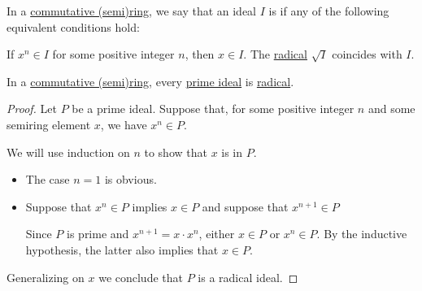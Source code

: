 \begin{definition}\label{def:radical_ideal}\mimprovised
  In a \hyperref[def:ring/commutative]{commutative (semi)ring}, we say that an ideal \( I \) is  if any of the following equivalent conditions hold:
  \begin{thmenum}
     If \( x^n \in I \) for some positive integer \( n \), then \( x \in I \).
     The \hyperref[def:radical_of_ideal]{radical} \( \sqrt I \) coincides with \( I \).
  \end{thmenum}
\end{definition}

\begin{proposition}\label{thm:prime_ideal_is_radical}
  In a \hyperref[def:ring/commutative]{commutative (semi)ring}, every \hyperref[def:semiring_ideal/prime]{prime ideal} is \hyperref[def:radical_ideal]{radical}.
\end{proposition}
\begin{proof}
  Let \( P \) be a prime ideal. Suppose that, for some positive integer \( n \) and some semiring element \( x \), we have \( x^n \in P \).

  We will use induction on \( n \) to show that \( x \) is in \( P \).
  \begin{itemize}
    \item The case \( n = 1 \) is obvious.
    \item Suppose that \( x^n \in P \) implies \( x \in P \) and suppose that \( x^{n+1} \in P \)

    Since \( P \) is prime and \( x^{n+1} = x \cdot x^n \), either \( x \in P \) or \( x^n \in P \). By the inductive hypothesis, the latter also implies that \( x \in P \).
  \end{itemize}

  Generalizing on \( x \) we conclude that \( P \) is a radical ideal.
\end{proof}

